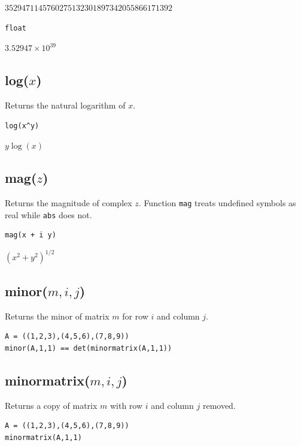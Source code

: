 \documentclass[12pt]{article}
\begin{document}
\noindent
$3529471145760275132301897342055866171392$

{\color{blue}
\begin{verbatim}
float
\end{verbatim}
}

\noindent
$\displaystyle 3.52947\times10^{39}$

\subsection*{log($x$)}

Returns the natural logarithm of $x$.

{\color{blue}
\begin{verbatim}
log(x^y)
\end{verbatim}
}

\noindent
$y\log(x)$

\subsection*{mag($z$)}

Returns the magnitude of complex $z$.
Function {\tt mag} treats undefined symbols as real while {\tt abs} does not.

{\color{blue}
\begin{verbatim}
mag(x + i y)
\end{verbatim}
}

\noindent
$\displaystyle (x^2+y^2)^{1/2}$

\subsection*{minor($m,i,j$)}

Returns the minor of matrix $m$ for row $i$ and column $j$.

{\color{blue}
\begin{verbatim}
A = ((1,2,3),(4,5,6),(7,8,9))
minor(A,1,1) == det(minormatrix(A,1,1))
\end{verbatim}
}


\subsection*{minormatrix($m,i,j$)}

Returns a copy of matrix $m$ with row $i$ and column $j$ removed.

{\color{blue}
\begin{verbatim}
A = ((1,2,3),(4,5,6),(7,8,9))
minormatrix(A,1,1)
\end{verbatim}
}
\end{document}
